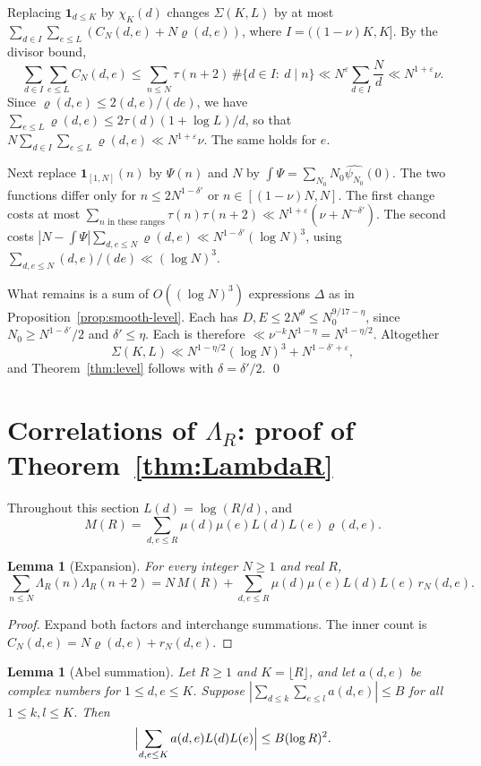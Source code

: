 \documentclass[11pt]{amsart}
\newtheorem{lemma}[theorem]{Lemma}
\theoremstyle{definition}
\theoremstyle{remark}
\numberwithin{equation}{section}
\newcommand{\eps}{\varepsilon}
\begin{document}
Replacing $\mathbf 1_{d\le K}$ by $\chi_K(d)$ changes $\Sigma(K,L)$ by at most
$\sum_{d\in I}\sum_{e\le L}(C_N(d,e)+N\varrho(d,e))$, where
$I=((1-\nu)K,K]$.  By the divisor bound,
\[
 \sum_{d\in I}\sum_{e\le L}C_N(d,e)
 \le\sum_{n\le N}\tau(n+2)\,\#\{d\in I:\ d\mid n\}
 \ll N^{\eps}\sum_{d\in I}\frac Nd\ll N^{1+\eps}\nu.
\]
Since $\varrho(d,e)\le2(d,e)/(de)$, we have
$\sum_{e\le L}\varrho(d,e)\le2\tau(d)(1+\log L)/d$, so that
$N\sum_{d\in I}\sum_{e\le L}\varrho(d,e)\ll N^{1+\eps}\nu$.  The same holds
for $e$.

Next replace $\mathbf 1_{[1,N]}(n)$ by $\Psi(n)$ and $N$ by
$\int\Psi=\sum_{N_0}N_0\widehat{\psi_{N_0}}(0)$.  The two functions differ
only for $n\le2N^{1-\delta'}$ or $n\in[(1-\nu)N,N]$.  The first change
costs at most
$\sum_{n\text{ in these ranges}}\tau(n)\tau(n+2)\ll N^{1+\eps}(\nu+N^{-\delta'})$.
The second costs
$|N-\int\Psi|\sum_{d,e\le N}\varrho(d,e)\ll N^{1-\delta'}(\log N)^3$, using
$\sum_{d,e\le N}(d,e)/(de)\ll(\log N)^3$.

What remains is a sum of $O((\log N)^3)$ expressions $\Delta$ as in
Proposition~\ref{prop:smooth-level}.  Each has $D,E\le2N^\theta\le
N_0^{9/17-\eta}$, since $N_0\ge N^{1-\delta'}/2$ and $\delta'\le\eta$.  Each
is therefore $\ll\nu^{-k}N^{1-\eta}=N^{1-\eta/2}$.  Altogether
\[
 \Sigma(K,L)\ll N^{1-\eta/2}(\log N)^3+N^{1-\delta'+\eps},
\]
and Theorem~\ref{thm:level} follows with $\delta=\delta'/2$.
\qed

\section{Correlations of $\Lambda_R$: proof of Theorem~\ref{thm:LambdaR}}\label{sec:LambdaR}

Throughout this section $L(d)=\log(R/d)$, and
\[
 M(R)=\sum_{d,e\le R}\mu(d)\mu(e)L(d)L(e)\varrho(d,e).
\]

\begin{lemma}[Expansion]\label{lem:expansion}
For every integer $N\ge1$ and real $R$,
\[
 \sum_{n\le N}\Lambda_R(n)\Lambda_R(n+2)
 =N\,M(R)+\sum_{d,e\le R}\mu(d)\mu(e)L(d)L(e)\,r_N(d,e).
\]
\end{lemma}

\begin{proof}
Expand both factors and interchange summations.  The inner count is
$C_N(d,e)=N\varrho(d,e)+r_N(d,e)$.
\end{proof}

\begin{lemma}[Abel summation]\label{lem:abel}
Let $R\ge1$ and $K=\lfloor R\rfloor$, and let $a(d,e)$ be complex numbers for
$1\le d,e\le K$.  Suppose
$|\sum_{d\le k}\sum_{e\le l}a(d,e)|\le B$ for all $1\le k,l\le K$.  Then
\[
 \Bigl|\sum_{d,e\le K}a(d,e)L(d)L(e)\Bigr|\le B(\log R)^2.
\]
\end{lemma}
\end{document}
